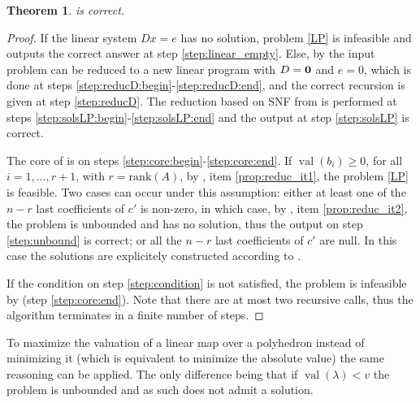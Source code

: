 \documentclass{elsarticle}
\theoremstyle{plain}
\newtheorem{theorem}{Theorem}[section]
\theoremstyle{definition}
\DeclareMathOperator{\val}{val}
\begin{document}
\begin{theorem}  is correct.
\end{theorem}
\begin{proof}
  If the linear system $Dx=e$ has no solution, problem \eqref{LP} is infeasible
  and  outputs the correct answer at step \ref{step:linear_empty}.
  Else, by  the input problem can be reduced to a new linear
  program with $D={\bf 0}$ and $e=0$, which is done at steps
  \ref{step:reducD:begin}-\ref{step:reducD:end},
  and the correct recursion is given at step \ref{step:reducD}.
  The reduction based on SNF from  is performed at
  steps \ref{step:solsLP:begin}-\ref{step:solsLP:end} and the output
  at step \ref{step:solsLP} is correct.

  The core of  is on steps \ref{step:core:begin}-\ref{step:core:end}.
  If $\val(b_i) \geq 0$, for all $i=1,\ldots,r+1$, with $r = \mathrm{rank}(A)$,
  by , item \ref{prop:reduc_it1}, the problem \eqref{LP} is feasible.
  Two cases can occur under this assumption:
  either at least one of the $n-r$ last coefficients of $c'$ is non-zero,
  in which case,
  by , item \ref{prop:reduc_it2}, the problem is
  unbounded and has no solution, thus the output on step \ref{step:unbound} is correct;
  or all the $n-r$ last coefficients of $c'$ are null. In this case the solutions
  are explicitely constructed according to .

  If the condition on step \ref{step:condition} is not satisfied, the problem
  is infeasible by  (step \ref{step:core:end}).
  Note that there are at most two recursive calls, thus
  the algorithm terminates in a finite number of steps.
\end{proof}


\begin{remark}
  To maximize the valuation of a linear map over a polyhedron instead of minimizing it 
  (which is equivalent to minimize the absolute value) the same reasoning can be applied. 
  The only difference being that if $\val\left( \lambda\right) < v$ the problem is unbounded
  and as such does not admit a solution. 
\end{remark}
\end{document}
